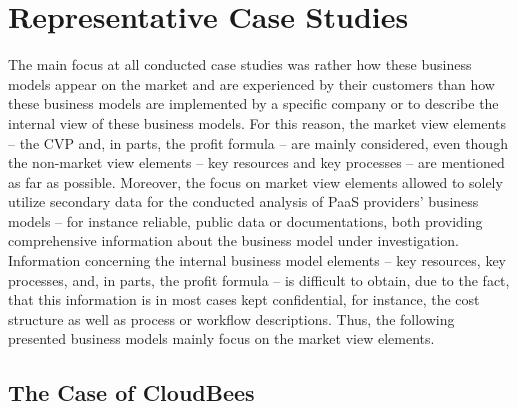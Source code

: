 
\section{Representative Case Studies}

The main focus at all conducted case studies was rather how these business models appear on the market and are experienced by their customers than how these business models are implemented by a specific company or to describe the internal view of these business models. For this reason, the market view elements -- the \ac{CVP} and, in parts, the profit formula -- are mainly considered, even though the non-market view elements -- key resources and key processes -- are mentioned as far as possible. Moreover, the focus on market view elements allowed to solely utilize secondary data for the conducted analysis of \ac{PaaS} providers' business models -- for instance reliable, public data or documentations, both providing comprehensive information about the business model under investigation. Information concerning the internal business model elements -- key resources, key processes, and, in parts, the profit formula -- is difficult to obtain, due to the fact, that this information is in most cases kept confidential, for instance, the cost structure as well as process or workflow descriptions. Thus, the following presented business models mainly focus on the market view elements.

\subsection{The Case of CloudBees}\label{ch:sota:cb}


